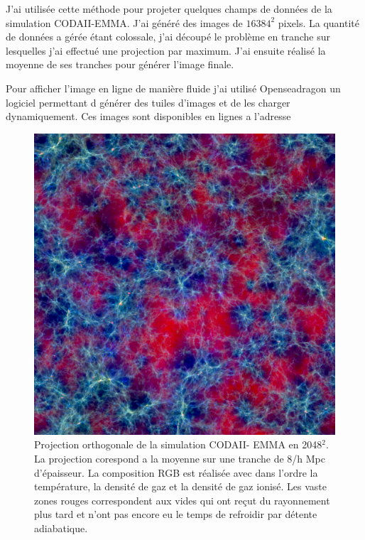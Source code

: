 

J'ai utilisée cette méthode pour projeter quelques champs de données de la simulation CODAII-EMMA.
J'ai généré des images de $16384^2$ pixels.
La quantité de données a gérée étant colossale, j'ai découpé le problème en tranche sur lesquelles j'ai effectué une projection par maximum.
J'ai ensuite réalisé la moyenne de ses tranches pour générer l'image finale.

Pour afficher l'image en ligne de manière fluide j'ai utilisé Openseadragon %
un logiciel permettant d générer des tuiles d'images et de les charger dynamiquement.
Ces images sont disponibles en lignes a l'adresse %

\begin{figure}[bth]
        \includegraphics[width=.95\textwidth]{img/04/rgb-compose.jpeg} 
        \caption{Projection orthogonale de la simulation CODAII- EMMA en 2048$^2$.
        La projection corespond a la moyenne sur une tranche de 8/h Mpc d'épaisseur. 
        La composition RGB est réalisée avec dans l'ordre la température, la densité de gaz et la densité de gaz ionisé.
		Les vaste zones rouges correspondent aux vides qui ont reçut du rayonnement plus tard et n'ont pas encore eu le temps de refroidir par détente adiabatique.  
        }
 		\label{fig:ortho}
\end{figure}

